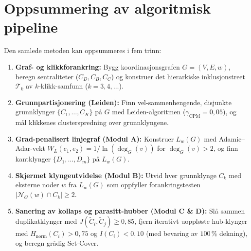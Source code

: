 \documentclass[11pt,a4paper]{article}
\begin{document}
\section{Oppsummering av algoritmisk pipeline}

Den samlede metoden kan oppsummeres i fem trinn:
\begin{enumerate}[label=\textbf{Trinn \arabic*:}]
  \item \textbf{Graf- og klikkforankring:} Bygg koordinasjonsgrafen $G = (V, E, w)$, beregn sentraliteter ($C_D, C_B, C_C$) og konstruer det hierarkiske inklusjonstreet $\mathcal{T}_k$ av $k$-klikk-samfunn ($k = 3, 4, \dots$).
  \item \textbf{Grunnpartisjonering (Leiden):} Finn vel-sammenhengende, disjunkte grunnklynger $\{C_1, \dots, C_K\}$ på $G$ med Leiden-algoritmen ($\gamma_{\text{CPM}} = 0{,}05$), og mål klikkenes clusterspredning over grunnklyngene.
  \item \textbf{Grad-penalisert linjegraf (Modul A):} Konstruer $L_w(G)$ med Adamic--Adar-vekt $W_L(e_1, e_2) = 1/\ln(\deg_G(v))$ for $\deg_G(v) > 2$, og finn kantklynger $\{D_1, \dots, D_m\}$ på $L_w(G)$.
  \item \textbf{Skjermet klyngeutvidelse (Modul B):} Utvid hver grunnklynge $C_k$ med eksterne noder $w$ fra $L_w(G)$ som oppfyller forankringstesten $|\mathcal{N}_G(w) \cap C_k| \ge 2$.
  \item \textbf{Sanering av kollaps og parasitt-hubber (Modul C \& D):} Slå sammen duplikatklynger med $J(\widetilde{C}_i, \widetilde{C}_j) \ge 0{,}85$, fjern iterativt uoppløste hub-klynger med $H_{\text{norm}}(C_i) > 0{,}75$ og $I(C_i) < 0{,}10$ (med bevaring av $100\,\%$ dekning), og beregn grådig Set-Cover.
\end{enumerate}
\end{document}
